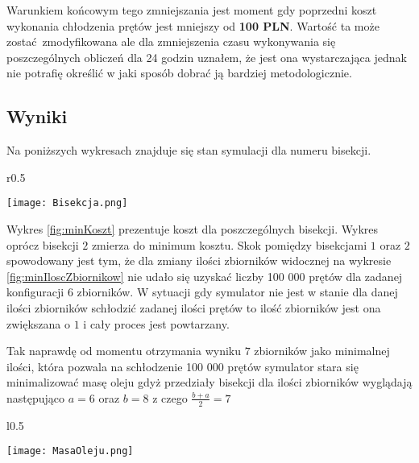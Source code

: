 \documentclass[varwidth,12pt,a4paper]{article}
\begin{document}
Warunkiem końcowym tego zmniejszania jest moment gdy poprzedni koszt wykonania chłodzenia
prętów jest mniejszy od \textbf{100 PLN}. Wartość ta może zostać zmodyfikowana ale dla
zmniejszenia czasu wykonywania się poszczególnych obliczeń dla 24 godzin uznałem, że jest
ona wystarczająca jednak nie potrafię określić w jaki sposób dobrać ją bardziej metodologicznie.

\begin{table}[H]
    \centering{}
    \caption{Współczynniki użyte podczas symulacji}
\end{table}


\subsection{Wyniki}

Na poniższych wykresach znajduje się stan symulacji dla numeru bisekcji.

\begin{wrapfigure}{r}{0.5\textwidth}
  \vspace{-20pt}
  \begin{center}
    \texttt{[image: Bisekcja.png]}
  \end{center}
  \vspace{-20pt}
  \caption{Koszt chłodzenia prętów}
  \vspace{30pt}
  \label{fig:minKoszt}
\end{wrapfigure}

Wykres \ref{fig:minKoszt} prezentuje koszt dla poszczególnych bisekcji. Wykres oprócz bisekcji $2$
zmierza do minimum kosztu. Skok pomiędzy bisekcjami $1$ oraz $2$ spowodowany jest tym, że dla zmiany
ilości zbiorników widocznej na wykresie \ref{fig:minIloscZbiornikow} nie udało się uzyskać liczby
100 000 prętów dla zadanej konfiguracji $6$ zbiorników. W sytuacji gdy symulator nie jest w stanie
dla danej ilości zbiorników schłodzić zadanej ilości prętów to ilość zbiorników jest ona zwiększana o $1$ i cały
proces jest powtarzany. 

Tak naprawdę od momentu otrzymania wyniku $7$ zbiorników jako minimalnej ilości, która pozwala na
schłodzenie 100 000 prętów symulator stara się minimalizować masę oleju gdyż przedziały bisekcji
dla ilości zbiorników wyglądają następująco $a = 6$ oraz $b = 8$ z czego $\frac{b + a}{2} = 7$

\begin{wrapfigure}{l}{0.5\textwidth}
  \vspace{-20pt}
  \begin{center}
    \texttt{[image: MasaOleju.png]}
  \end{center}
  \vspace{-20pt}
  \caption{Masa oleju}
  \vspace{30pt}
  \label{fig:minMasaOleju}
\end{wrapfigure}
\end{document}
